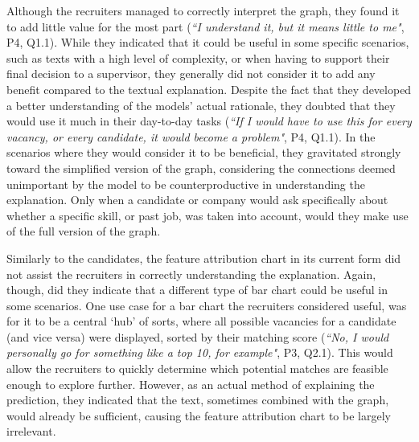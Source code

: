 Although the recruiters managed to correctly interpret the graph, they found it to add little value for the most part (\textit{``I understand it, but it means little to me"}, P4, Q1.1). While they indicated that it could be useful in some specific scenarios, such as texts with a high level of complexity, or when having to support their final decision to a supervisor, they generally did not consider it to add any benefit compared to the textual explanation. Despite the fact that they developed a better understanding of the models' actual rationale, they doubted that they would use it much in their day-to-day tasks (\textit{``If I would have to use this for every vacancy, or every candidate, it would become a problem"}, P4, Q1.1). In the scenarios where they would consider it to be beneficial, they gravitated strongly toward the simplified version of the graph, considering the connections deemed unimportant by the model to be counterproductive in understanding the explanation. Only when a candidate or company would ask specifically about whether a specific skill, or past job, was taken into account, would they make use of the full version of the graph. 

Similarly to the candidates, the feature attribution chart in its current form did not assist the recruiters in correctly understanding the explanation. Again, though, did they indicate that a different type of bar chart could be useful in some scenarios. One use case for a bar chart the recruiters considered useful, was for it to be a central `hub' of sorts, where all possible vacancies for a candidate (and vice versa) were displayed, sorted by their matching score (\textit{``No, I would personally go for something like a top 10, for example"}, P3, Q2.1). This would allow the recruiters to quickly determine which potential matches are feasible enough to explore further. However, as an actual method of explaining the prediction, they indicated that the text, sometimes combined with the graph, would already be sufficient, causing the feature attribution chart to be largely irrelevant. 

